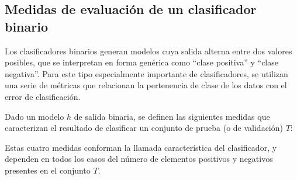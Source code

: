 %
%
\subsection{Medidas de evaluación de un clasificador binario}
%
Los clasificadores binarios generan modelos cuya salida alterna
entre dos valores posibles, que se interpretan en forma genérica
como ``clase positiva'' y ``clase negativa''.
Para este tipo especialmente
importante de clasificadores, se utilizan una serie de métricas que
relacionan la pertenencia de clase de los datos con el
error de clasificación.

Dado un modelo $h$ de salida binaria, se definen las siguientes
medidas que caracterizan el resultado de clasificar un conjunto de
prueba (o de validación) $T$:
%
\iflatexml{}
%
Estas cuatro medidas conforman la llamada 
característica del clasificador, y dependen en todos los casos del
número de elementos positivos y negativos presentes en el conjunto
$T$.
